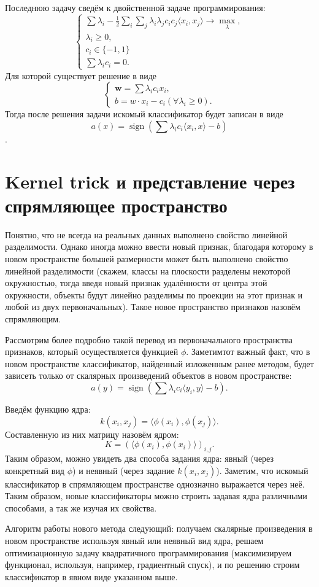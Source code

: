 \documentclass[twoside,twocolumn]{article}
\theoremstyle{plain}
\theoremstyle{definition}
\DeclareMathOperator{\sign}{sign}
\begin{document}
Последнюю задачу сведём к двойственной задаче программирования:
\[
\begin{cases}
\sum \lambda_i - \frac{1}{2}\sum_i \sum_j \lambda_i \lambda_j c_i c_j \langle x_i, x_j\rangle \xrightarrow{} \max_{\lambda}, \\
\lambda_i \geq 0, \\
c_i \in \{-1, 1\} \\
\sum \lambda_i c_i = 0.
\end{cases}
\]
Для которой существует решение в виде
\[
\begin{cases}
\mathbf{w}= \sum \lambda_i c_i x_i, \\
b = w \cdot x_i - c_i (\forall \lambda_i \geq 0).
\end{cases}
\]
Тогда после решения задачи искомый классификатор будет записан в виде
\[ a(x) = \sign(\sum \lambda_i c_i \langle x_i, x \rangle - b)\].

\section{Kernel trick и представление через спрямляющее пространство}
Понятно, что не всегда на реальных данных выполнено свойство линейной разделимости. Однако иногда можно ввести новый признак, благодаря которому в новом пространстве большей размерности может быть выполнено свойство линейной разделимости (скажем, классы на плоскости разделены некоторой окружностью, тогда введя новый признак удалённости от центра этой окружности, объекты будут линейно разделимы по проекции на этот признак и любой из двух первоначальных). Такое новое пространство признаков назовём спрямляющим. \par
Рассмотрим более подробно такой перевод из первоначального пространства признаков, который осуществляется функцией $\phi$. Заметимтот важный факт, что в новом пространстве классификатор, найденный изложенным ранее методом, будет зависеть только от скалярных произведений объектов в новом пространстве:
\[ a(y) = \sign(\sum \lambda_i c_i \langle y_i, y \rangle - b). \]\par
Введём функцию ядра:
\[k(x_i, x_j) = \langle \phi(x_i), \phi(x_j) \rangle.\]
Составленную из них матрицу назовём ядром:
\[K = (\langle \phi(x_i), \phi(x_i) \rangle )_{i, j}.\]
Таким образом, можно увидеть два способа задания ядра: явный (через конкретный вид $\phi$) и неявный (через задание $k(x_i, x_j)$). Заметим, что  искомый классификатор в спрямляющем пространстве однозначно выражается через неё. Таким образом, новые классификаторы можно строить задавая ядра различными способами, а так же изучая их свойства. \par
Алгоритм работы нового метода следующий: получаем скалярные произведения в новом пространстве используя явный или неявный вид ядра, решаем оптимизационную задачу квадратичного программирования (максимизируем функционал, используя, например, градиентный спуск), и по решению строим классификатор в явном виде указанном выше.
\end{document}
